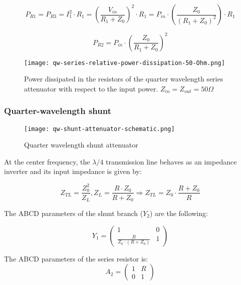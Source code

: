 \begin{equation}
    P_{R1} = P_{R3} = I_1^2 \cdot R_1 = \left( \frac{V_{in}}{R_1 + Z_0}\right)^2 \cdot R_1= P_{in} \cdot \left( \frac{ Z_0}{(R_1 + Z_0)^2} \right) \cdot R_1
\end{equation}

\begin{equation}
    P_{R2} = P_{in} \cdot \left( \frac{Z_0}{R_1 + Z_0} \right)^2
\end{equation}

\begin{figure}[ht]
    \centering
    \texttt{[image: qw-series-relative-power-dissipation-50-Ohm.png]}
    \caption{Power dissipated in the resistors of the quarter wavelength series attenuator with respect to the input power. $Z_{in} = Z_{out} = 50 \Omega$}
    \label{fig:qw-series-att-relative-power-dissipation-50-Ohm}
\end{figure}
\subsubsection{Quarter-wavelength shunt}

\begin{figure}[ht]
    \centering
    \texttt{[image: qw-shunt-attenuator-schematic.png]}
    \caption{Quarter wavelength shunt attenuator}
    \label{fig:qw-shunt-attenuator-schematic}
\end{figure}

\noindent At the center frequency, the $\lambda/4$ transmission line behaves as an impedance inverter and its input impedance is given by:

\begin{equation}
    Z_{TL} = \frac{Z_0^2}{Z_L}, Z_L = \frac{R \cdot Z_0}{R + Z_0} \Rightarrow Z_{TL} = Z_0 \cdot \frac{R + Z_0}{R}
\end{equation}

\noindent The ABCD parameters of the shunt branch ($Y_2$) are the following:

\begin{equation}
    Y_1 = \begin{pmatrix}
        1 & 0\\
        \frac{R}{Z_0 \cdot (R+Z_0)}  & 1
    \end{pmatrix}
\end{equation}

\noindent The ABCD parameters of the series resistor is:
\begin{equation}
    A_2 = \begin{pmatrix}
        1 & R\\
        0  & 1
    \end{pmatrix}
\end{equation}

